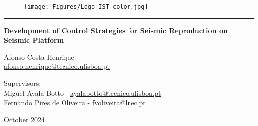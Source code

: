 \documentclass[9pt]{extarticle}
\begin{document}
\begin{titlepage} %

\centering


\begin{figure}
 \centering
 \texttt{[image: Figures/Logo\_IST\_color.jpg]}
\end{figure}


{ \rule{\linewidth}{0.5mm} }

{\Huge\bfseries Development of Control Strategies for Seismic Reproduction on Seismic Platform \par}
\vspace{0.2cm}
{\huge\bfseries \par}
\vspace{0.5cm}

\vspace{1cm}

\begin{figure}[H]
 \centering
\end{figure}

\vspace{1cm} 

\vspace{.2cm}

\huge Afonso Costa Henrique \\
\href{mailto:afonso.henrique@tecnico.ulisboa.pt}{\Large afonso.henrique@tecnico.ulisboa.pt}\par
\vspace{10mm}


Supervisors: \\
\vspace{2mm}
\Large
{Miguel Ayala Botto  - \href{mailto:ayalabotto@tecnico.ulisboa.pt}{ayalabotto@tecnico.ulisboa.pt}}\\
\vspace{1mm}
{Fernando Pires de Oliveira  - \href{mailto:fvoliveira@lnec.pt}{fvoliveira@lnec.pt}}     \\


\vspace{.7cm}

\vfill {\large October 2024\par} %

\end{titlepage}
\setcounter{page}{2}
\clearpage
 
\end{document}
